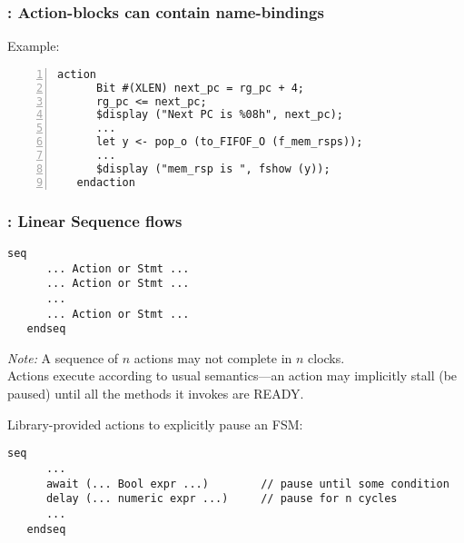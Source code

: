 
\begin{frame}[fragile]
\frametitle{{\BSV}: Action-blocks can contain name-bindings}

\footnotesize

Example:
\begin{Verbatim}[frame=single, numbers=left]
   action
      Bit #(XLEN) next_pc = rg_pc + 4;
      rg_pc <= next_pc;
      $display ("Next PC is %08h", next_pc);
      ...
      let y <- pop_o (to_FIFOF_O (f_mem_rsps));
      ...
      $display ("mem_rsp is ", fshow (y));
   endaction
\end{Verbatim}

\end{frame}


\begin{frame}[fragile]
\frametitle{{\BSV}: Linear Sequence flows}

\footnotesize

\begin{Verbatim}[frame=single]
   seq
      ... Action or Stmt ...
      ... Action or Stmt ...
      ...
      ... Action or Stmt ...
   endseq
\end{Verbatim}

\emph{Note:} A sequence of $n$ actions may not complete in $n$ clocks.  \\
Actions execute according to usual {\BSV} semantics---an action may
implicitly stall (be paused) until all the methods it invokes are
READY.

\PAUSE{\vspace{2ex}}

Library-provided actions to explicitly pause an FSM:
\begin{Verbatim}[frame=single]
   seq
      ...
      await (... Bool expr ...)        // pause until some condition
      delay (... numeric expr ...)     // pause for n cycles
      ...
   endseq
\end{Verbatim}

\end{frame}


